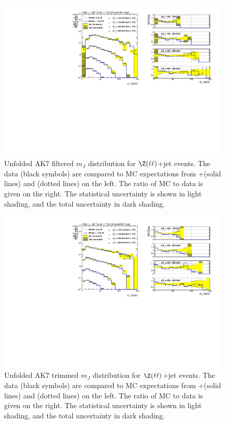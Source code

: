 \begin{figure}[!htb]
\includegraphics[width=0.99\textwidth]{figs/Zll/jetmassunf_ak7ft_log_Z.pdf}
\caption{Unfolded AK7 filtered $m_J$ distribution for $\Z(\ell\ell)$+jet events. The data (black symbols) are compared to MC expectations from {\MADGRAPH}+\PYTHIA (solid lines) and \HERWIG (dotted lines) on the left. The ratio of MC to data is given on the right.
The statistical uncertainty is shown in light shading, and the total uncertainty in dark shading.}
\label{figs:AK7ZmmInt3}
\end{figure}

\begin{figure}[!htb]
\includegraphics[width=0.99\textwidth]{figs/Zll/jetmassunf_ak7tr_log_Z.pdf}
\caption{Unfolded AK7 trimmed $m_J$ distribution for $\Z(\ell\ell)$+jet events. The data (black symbols) are compared to MC expectations from {\MADGRAPH}+\PYTHIA (solid lines) and \HERWIG (dotted lines) on the left. The ratio of MC to data is given on the right.
The statistical uncertainty is shown in light shading, and the total uncertainty in dark shading.}
\label{figs:AK7ZmmInt4}
\end{figure}

